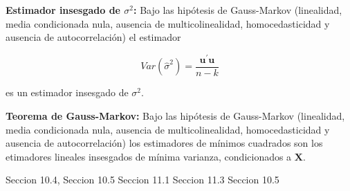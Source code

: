 \begin{teorema}
\textbf{Estimador insesgado de $\sigma^2$:} Bajo las hip\'otesis de Gauss-Markov (linealidad, media condicionada nula, ausencia de multicolinealidad, homocedasticidad y ausencia de autocorrelaci\'on) el estimador

\[Var(\hat{\sigma}^2)=\dfrac{\boldsymbol{u}^{\prime}\boldsymbol{u}}{n-k}\]

es un estimador insesgado de $\sigma^2$.

\end{teorema}

\begin{teorema}
\textbf{Teorema de Gauss-Markov:} Bajo las hip\'otesis de Gauss-Markov (linealidad, media condicionada nula, ausencia de multicolinealidad, homocedasticidad y ausencia de autocorrelaci\'on) los estimadores de m\'inimos cuadrados son los etimadores lineales insesgados de m\'inima varianza, condicionados a $\boldsymbol{X}$.

\end{teorema}

Seccion 10.4, 
Seccion 10.5
Seccion 11.1
Seccion 11.3
Seccion 10.5